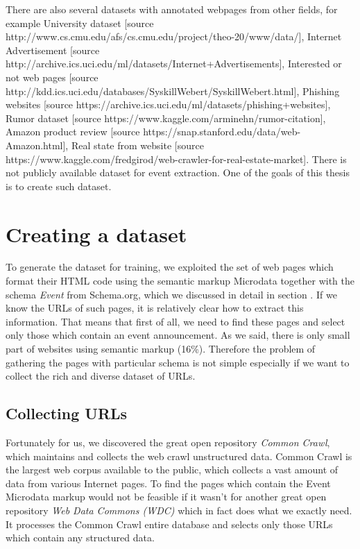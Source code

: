 There are also several datasets with annotated webpages from other fields, for example University dataset [source http://www.cs.cmu.edu/afs/cs.cmu.edu/project/theo-20/www/data/], Internet Advertisement [source  http://archive.ics.uci.edu/ml/datasets/Internet+Advertisements], Interested or not web pages [source http://kdd.ics.uci.edu/databases/SyskillWebert/SyskillWebert.html], Phishing websites [source https://archive.ics.uci.edu/ml/datasets/phishing+websites], Rumor dataset [source https://www.kaggle.com/arminehn/rumor-citation], Amazon product review [source https://snap.stanford.edu/data/web-Amazon.html], Real state from website [source https://www.kaggle.com/fredgirod/web-crawler-for-real-estate-market]. There is not publicly available dataset for event extraction. One of the goals of this thesis is to create such dataset.

\section{Creating a dataset}

To generate the dataset for training, we exploited the set of web pages which format their HTML code using the semantic markup Microdata together with the schema \textit{Event} from Schema.org, which we discussed in detail in section   . If we know the URLs of such pages, it is relatively clear how to extract this information. That means that first of all, we need to find these pages and select only those which contain an event announcement. As we said, there is only small part of websites using semantic markup (16\%). Therefore the problem of gathering the pages with particular schema is not simple especially if we want to collect the rich and diverse dataset of URLs. \\

\subsection{Collecting URLs}

Fortunately for us, we discovered the great open repository \textit{Common Crawl}, which maintains and collects the web crawl unstructured data. Common Crawl is the largest web corpus available to the public, which collects a vast amount of data from various Internet pages. To find the pages which contain the Event Microdata markup would not be feasible if it wasn't for another great open repository \textit{Web Data Commons (WDC)} which in fact does what we exactly need. It processes the Common Crawl entire database and selects only those URLs which contain any structured data.\\

